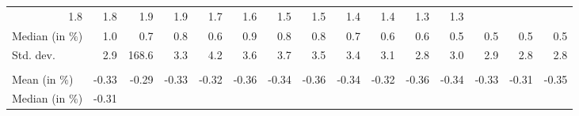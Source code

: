 \begin{tabular}{lllllllllllllll}
  \multicolumn{1}{r}{1.8} &
  \multicolumn{1}{r}{1.8} &
  \multicolumn{1}{r}{1.9} &
  \multicolumn{1}{r}{1.9} &
  \multicolumn{1}{r}{1.7} &
  \multicolumn{1}{r}{1.6} &
  \multicolumn{1}{r}{1.5} &
  \multicolumn{1}{r}{1.5} &
  \multicolumn{1}{r}{1.4} &
  \multicolumn{1}{r}{1.4} &
  \multicolumn{1}{r}{1.3} &
  \multicolumn{1}{r}{1.3} \\
\multicolumn{1}{l}{\hspace{2em}Median (in $\%$)} &
  \multicolumn{1}{|r}{1.0} &
  \multicolumn{1}{r}{0.7} &
  \multicolumn{1}{r}{0.8} &
  \multicolumn{1}{r}{0.6} &
  \multicolumn{1}{r}{0.9} &
  \multicolumn{1}{r}{0.8} &
  \multicolumn{1}{r}{0.8} &
  \multicolumn{1}{r}{0.7} &
  \multicolumn{1}{r}{0.6} &
  \multicolumn{1}{r}{0.6} &
  \multicolumn{1}{r}{0.5} &
  \multicolumn{1}{r}{0.5} &
  \multicolumn{1}{r}{0.5} &
  \multicolumn{1}{r}{0.5} \\
\multicolumn{1}{l}{\hspace{2em}Std. dev.} &
  \multicolumn{1}{|r}{2.9} &
  \multicolumn{1}{r}{168.6} &
  \multicolumn{1}{r}{3.3} &
  \multicolumn{1}{r}{4.2} &
  \multicolumn{1}{r}{3.6} &
  \multicolumn{1}{r}{3.7} &
  \multicolumn{1}{r}{3.5} &
  \multicolumn{1}{r}{3.4} &
  \multicolumn{1}{r}{3.1} &
  \multicolumn{1}{r}{2.8} &
  \multicolumn{1}{r}{3.0} &
  \multicolumn{1}{r}{2.9} &
  \multicolumn{1}{r}{2.8} &
  \multicolumn{1}{r}{2.8} \\
\multicolumn{1}{l}{\hspace{1em}{\textit{Elasticity} ($\widehat{\beta}$)}} &
  \multicolumn{1}{|r}{} &
  \multicolumn{1}{r}{} &
  \multicolumn{1}{r}{} &
  \multicolumn{1}{r}{} &
  \multicolumn{1}{r}{} &
  \multicolumn{1}{r}{} &
  \multicolumn{1}{r}{} &
  \multicolumn{1}{r}{} &
  \multicolumn{1}{r}{} &
  \multicolumn{1}{r}{} &
  \multicolumn{1}{r}{} &
  \multicolumn{1}{r}{} &
  \multicolumn{1}{r}{} &
  \multicolumn{1}{r}{} \\
\multicolumn{1}{l}{\hspace{2em}Mean (in $\%$)} &
  \multicolumn{1}{|r}{-0.33} &
  \multicolumn{1}{r}{-0.29} &
  \multicolumn{1}{r}{-0.33} &
  \multicolumn{1}{r}{-0.32} &
  \multicolumn{1}{r}{-0.36} &
  \multicolumn{1}{r}{-0.34} &
  \multicolumn{1}{r}{-0.36} &
  \multicolumn{1}{r}{-0.34} &
  \multicolumn{1}{r}{-0.32} &
  \multicolumn{1}{r}{-0.36} &
  \multicolumn{1}{r}{-0.34} &
  \multicolumn{1}{r}{-0.33} &
  \multicolumn{1}{r}{-0.31} &
  \multicolumn{1}{r}{-0.35} \\
\multicolumn{1}{l}{\hspace{2em}Median (in $\%$)} &
  \multicolumn{1}{|r}{-0.31} &

\end{tabular}
